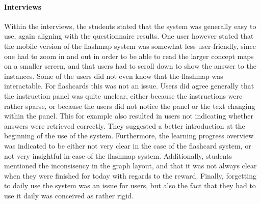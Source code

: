 \paragraph{Interviews} Within the interviews, the students stated that the system was generally easy to use, again aligning with the questionnaire results. One user however stated that the mobile version of the flashmap system was somewhat less user-friendly, since one had to zoom in and out in order to be able to read the larger concept maps on a smaller screen, and that users had to scroll down to show the answer to the instances. Some of the users did not even know that the flashmap was interactable. For flashcards this was not an issue. Users did agree generally that the instruction panel was quite unclear, either because the instructions were rather sparse, or because the users did not notice the panel or the text changing within the panel. This for example also resulted in users not indicating whether answers were retrieved correctly. They suggested a better introduction at the beginning of the use of the system. Furthermore, the learning progress overview was indicated to be either not very clear in the case of the flashcard system, or not very insightful in case of the flashmap system. Additionally, students mentioned the inconsisency in the graph layout, and that it was not always clear when they were finished for today with regards to the reward. Finally, forgetting to daily use the system was an issue for users, but also the fact that they had to use it daily was conceived as rather rigid.
